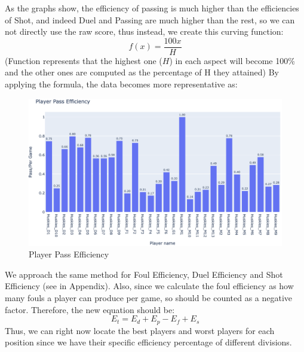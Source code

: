 \documentclass[12pt]{article}
\begin{document}
\newline
\newline
As the graphs show, the efficiency of passing is much higher than the efficiencies of Shot, and indeed Duel and Passing are much higher than the rest, so we can not directly use the raw score, thus instead, we create this curving function: 
\begin{equation*}
    f(x) = \frac{100x}{H}
\end{equation*}
(Function represents that the highest one ($H$) in each aspect will become 100\% and the other ones are computed as the percentage of H they attained) 
By applying the formula, the data becomes more representative as:
\begin{figure}[h]
\begin{center}
\includegraphics[scale=0.5]{images/6.png}
\caption{Player Pass Efficiency}
\end{center}
\end{figure}\newline
We approach the same method for Foul Efficiency, Duel Efficiency and Shot Efficiency (see in Appendix).\newline
Also, since we calculate the foul efficiency as how many fouls a player can produce per game, so should be counted as a negative factor. Therefore, the new equation should be: 
\begin{equation*}
 E_t= E_d + E_p - E_f + E_s
\end{equation*}
Thus, we can right now locate the best players and worst players for each position since we have their specific efficiency percentage of different divisions. 
\end{document}
